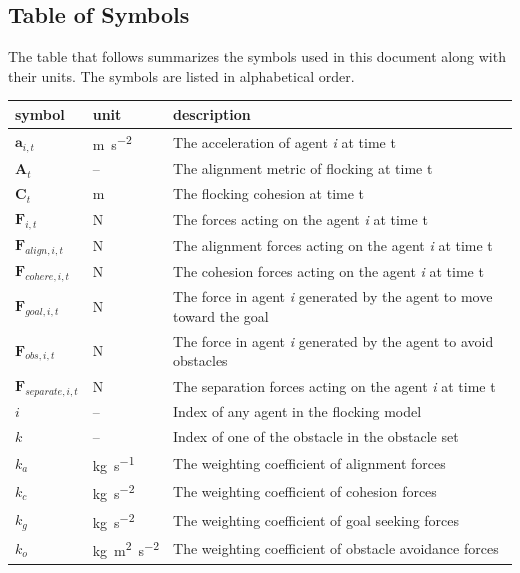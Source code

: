 \documentclass[12pt]{article}
\begin{document}
\subsection{Table of Symbols}

The table that follows summarizes the symbols used in this document along with
their units. The symbols are listed in alphabetical order.

\renewcommand{\arraystretch}{1.2}
\noindent \begin{longtable*}{l l p{12cm}} \toprule
\textbf{symbol} & \textbf{unit} & \textbf{description}\\
\midrule 
$\mathbf{a}_{i,t}$ & \si{\metre\per\second\squared} & The acceleration of agent \textit{i} at time t\\
$\mathbf{A}_t$ & -- & The alignment metric of flocking at time t \\
$\mathbf{C}_t$ & \si{\metre} & The flocking cohesion at time t\\
$\mathbf{F}_{i,t}$ & \si{\newton} & The forces acting on the agent \textit{i} at time t\\
$\mathbf{F}_{align,i,t}$ & \si{\newton} & The alignment forces acting on the agent \textit{i} at time t\\
$\mathbf{F}_{cohere,i,t}$ & \si{\newton} & The cohesion forces acting on the agent \textit{i} at time t\\
$\mathbf{F}_{goal,i,t}$ & \si{\newton} & The force in agent \textit{i} generated by the agent to move toward the goal\\
$\mathbf{F}_{obs,i,t}$ & \si{\newton} & The force in agent \textit{i} generated by the agent to avoid obstacles\\
$\mathbf{F}_{separate,i,t}$ & \si{\newton} & The separation forces acting on the agent \textit{i} at time t\\
$i$  & -- & Index of any agent in the flocking model \\
$k$  & -- & Index of one of the obstacle in the obstacle set \\
$k_a$  & \si{\kilogram\per\second} & The weighting coefficient of alignment forces \\
$k_c$  & \si{\kilogram\per\second\squared} & The weighting coefficient of cohesion forces \\
$k_g$  & \si{\kilogram\per\second\squared} & The weighting coefficient of goal seeking forces \\
$k_o$  & \si{\kilogram\metre\squared\per\second\squared} & The weighting coefficient of obstacle avoidance forces \\

\end{longtable*}
\end{document}
